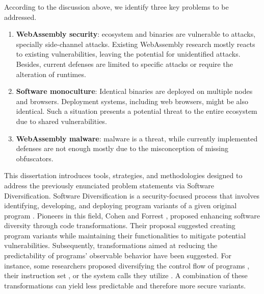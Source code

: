 
According to the discussion above, we identify three key problems to be addressed.

\begin{enumerate}[label=\textbf{PS\arabic*}, ref=C\arabic*]

	\item \label{prob4} \textbf{WebAssembly security}: \Wasm ecosystem and binaries are vulnerable to attacks, specially side-channel attacks. Existing WebAssembly research mostly reacts to existing vulnerabilities, leaving the potential for unidentified attacks.
	Besides, current defenses are limited to specific attacks or require the alteration of runtimes. 
	
	\item \label{prob2} \textbf{Software monoculture}: 
	Identical \Wasm binaries are deployed on multiple nodes and browsers. 
	Deployment systems, including web browsers, might be also identical. 
	Such a situation presents a potential threat to the entire ecosystem due to shared vulnerabilities.
	 
	\item \label{prob5} \textbf{WebAssembly malware}: \Wasm malware is a threat, while currently implemented defenses are not enough mostly due to the misconception of missing obfuscators.

\end{enumerate}


\begin{comment}
\msection{Problem statement}

\end{comment}


This dissertation introduces tools, strategies, and methodologies designed to address the previously enunciated problem statements via Software Diversification.
Software Diversification is a security-focused process that involves identifying, developing, and deploying program variants of a given original program \cite{okhravi2013survey}.
Pioneers in this field, Cohen \etal \cite{cohen1993operating} and Forrest \etal \cite{595185}, proposed enhancing software diversity through code transformations. 
Their proposal suggested creating program variants while maintaining their functionalities to mitigate potential vulnerabilities.
Subsequently, transformations aimed at reducing the predictability of programs' observable behavior have been suggested. For instance, some researchers proposed diversifying the control flow of programs \cite{davi2015isomeron}, their instruction set \cite{barrantes2003randomized}, or the system calls they utilize \cite{Chew02mitigatingbuffer}. 
A combination of these transformations can yield less predictable and therefore more secure variants.

